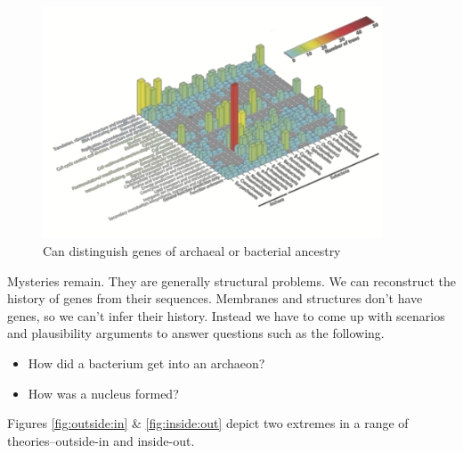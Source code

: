 \documentclass[]{article}
\begin{document}
\begin{figure}[H]
	\caption[Can distinguish genes of archaeal or bacterial ancestry]{Can distinguish genes of archaeal or bacterial ancestry\cite{thiergart2012evolutionary}}
	\label{fig:distinguish:genes:archaeal:bacterial}
	\includegraphics[width=0.9\textwidth]{thiergart2012}
\end{figure}

Mysteries remain. They are generally structural problems. We can reconstruct the history of genes from their sequences. Membranes and structures don't have genes, so we can't infer their history. Instead we have to come up with scenarios and plausibility arguments to answer questions such as the following. 

\begin{itemize}
	\item How did a bacterium get into an archaeon? 
	\item How was a nucleus formed?
\end{itemize}

Figures \ref{fig:outside:in} \& \ref{fig:inside:out} depict  two extremes in a range of theories--outside-in and inside-out.
\end{document}
